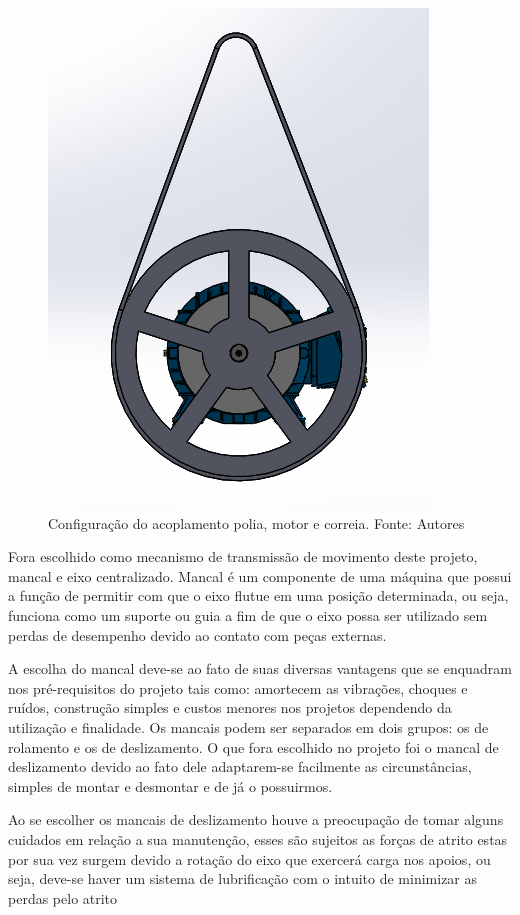 \begin{figure}[H]
\centering
\includegraphics[scale=0.6]{figuras/config_polia.png}
\caption{Configuração do acoplamento polia, motor e correia. Fonte: Autores}
\label{fig:config_polia}
\end{figure}


    Fora escolhido como mecanismo de transmissão de movimento deste projeto, mancal e eixo centralizado. Mancal é um componente de uma máquina que possui a função de permitir com que o eixo flutue em uma posição determinada, ou seja, funciona como um suporte ou guia a fim de que o eixo possa ser utilizado sem perdas de desempenho devido ao contato com peças externas.

    A escolha do mancal deve-se ao fato de suas diversas vantagens que se enquadram nos pré-requisitos do projeto tais como: amortecem as vibrações, choques e ruídos, construção simples e custos menores nos projetos dependendo da utilização e finalidade. Os mancais podem ser separados em dois grupos: os de rolamento e os de deslizamento. O que fora escolhido no projeto foi o mancal de deslizamento devido ao fato dele adaptarem-se facilmente as circunstâncias, simples de montar e desmontar e de já o possuirmos.

    Ao se escolher os mancais de deslizamento houve a preocupação de tomar alguns cuidados em relação a sua manutenção, esses são sujeitos as forças de atrito estas por sua vez surgem devido a rotação do eixo que exercerá carga nos apoios, ou seja, deve-se haver um sistema de lubrificação com o intuito de minimizar as perdas pelo atrito

